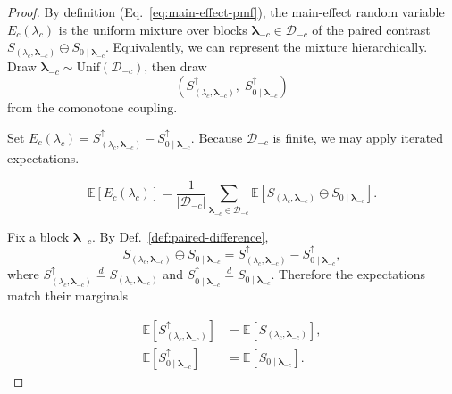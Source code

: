 \begin{proof}
    \label{prf:main-effect-anova}
By definition (Eq.~\eqref{eq:main-effect-pmf}), the main-effect random variable
$E_c(\lambda_c)$ is the uniform mixture over blocks
$\boldsymbol{\lambda}_{-c}\in\mathcal{D}_{-c}$ of the paired contrast
$S_{(\lambda_c,\boldsymbol{\lambda}_{-c})}\ominus S_{0\mid \boldsymbol{\lambda}_{-c}}$.
Equivalently, we can represent the mixture hierarchically.
Draw $\boldsymbol{\lambda}_{-c}\sim \mathrm{Unif}(\mathcal{D}_{-c})$, then draw
\[
\left(
S_{(\lambda_c,\boldsymbol{\lambda}_{-c})}^\uparrow,\;
S_{0\mid \boldsymbol{\lambda}_{-c}}^\uparrow
\right)
\]
from the comonotone coupling.

Set
$E_c(\lambda_c) = S_{(\lambda_c,\boldsymbol{\lambda}_{-c})}^\uparrow
- S_{0\mid \boldsymbol{\lambda}_{-c}}^\uparrow$.
Because $\mathcal{D}_{-c}$ is finite, we may apply iterated expectations.

{\small
\begin{equation}
\label{eq:proof-iterated-exp}
\mathbb{E}\!\left[E_c(\lambda_c)\right]
=
\frac{1}{|\mathcal{D}_{-c}|}
\sum_{\boldsymbol{\lambda}_{-c}\in\mathcal{D}_{-c}}
\mathbb{E}\!\left[
S_{(\lambda_c,\boldsymbol{\lambda}_{-c})}\ominus S_{0\mid \boldsymbol{\lambda}_{-c}}
\right].
\end{equation}
}

Fix a block $\boldsymbol{\lambda}_{-c}$. By Def.~\ref{def:paired-difference},
\[
S_{(\lambda_c,\boldsymbol{\lambda}_{-c})}\ominus S_{0\mid \boldsymbol{\lambda}_{-c}}
=
S_{(\lambda_c,\boldsymbol{\lambda}_{-c})}^\uparrow
-
S_{0\mid \boldsymbol{\lambda}_{-c}}^\uparrow,
\]
where
$S_{(\lambda_c,\boldsymbol{\lambda}_{-c})}^\uparrow \stackrel{d}{=}
S_{(\lambda_c,\boldsymbol{\lambda}_{-c})}$ and
$S_{0\mid \boldsymbol{\lambda}_{-c}}^\uparrow \stackrel{d}{=}
S_{0\mid \boldsymbol{\lambda}_{-c}}$.
Therefore the expectations match their marginals

{\small
\begin{align}  
  \mathbb{E}\!\left[S_{(\lambda_c,\boldsymbol{\lambda}_{-c})}^\uparrow\right]
  &=
  \mathbb{E}\!\left[S_{(\lambda_c,\boldsymbol{\lambda}_{-c})}\right], \\
  \mathbb{E}\!\left[S_{0\mid \boldsymbol{\lambda}_{-c}}^\uparrow\right]
  &=
  \mathbb{E}\!\left[S_{0\mid \boldsymbol{\lambda}_{-c}}\right].
\end{align}
}


\end{proof}
